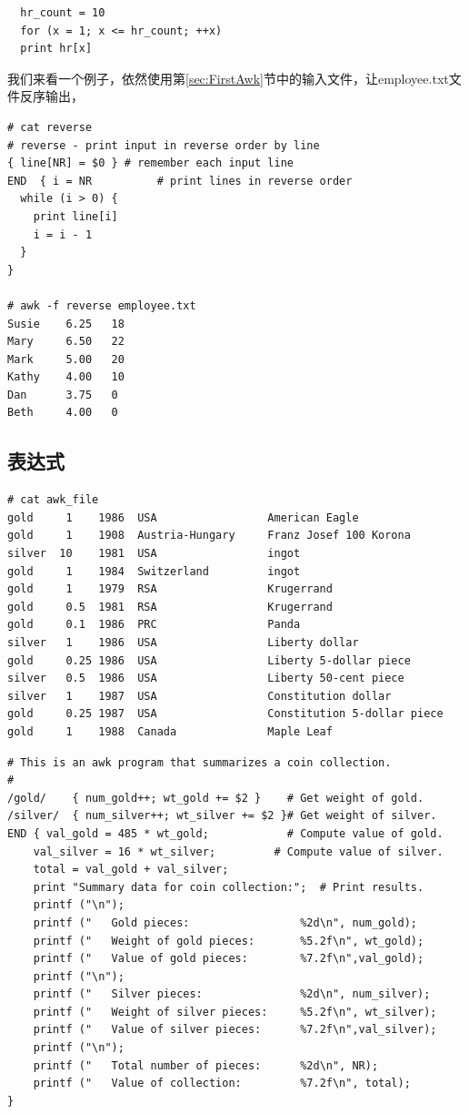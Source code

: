 \begin{verbatim}
  hr_count = 10
  for (x = 1; x <= hr_count; ++x)
  print hr[x]
\end{verbatim}

我们来看一个例子，依然使用第\ref{sec:FirstAwk}节中的输入文件，让employee.txt文件反序输出，

\begin{verbatim}
# cat reverse
# reverse - print input in reverse order by line
{ line[NR] = $0 } # remember each input line
END  { i = NR          # print lines in reverse order
  while (i > 0) {
    print line[i]
    i = i - 1
  }
}
  
# awk -f reverse employee.txt
Susie    6.25   18
Mary     6.50   22
Mark     5.00   20
Kathy    4.00   10
Dan      3.75   0
Beth     4.00   0
\end{verbatim}

\subsection{表达式}

\begin{verbatim}
# cat awk_file 
gold     1    1986  USA                 American Eagle
gold     1    1908  Austria-Hungary     Franz Josef 100 Korona
silver  10    1981  USA                 ingot
gold     1    1984  Switzerland         ingot
gold     1    1979  RSA                 Krugerrand
gold     0.5  1981  RSA                 Krugerrand
gold     0.1  1986  PRC                 Panda
silver   1    1986  USA                 Liberty dollar
gold     0.25 1986  USA                 Liberty 5-dollar piece
silver   0.5  1986  USA                 Liberty 50-cent piece
silver   1    1987  USA                 Constitution dollar
gold     0.25 1987  USA                 Constitution 5-dollar piece
gold     1    1988  Canada              Maple Leaf
\end{verbatim}

\begin{verbatim}
# This is an awk program that summarizes a coin collection.
#
/gold/    { num_gold++; wt_gold += $2 }    # Get weight of gold.
/silver/  { num_silver++; wt_silver += $2 }# Get weight of silver.
END { val_gold = 485 * wt_gold;            # Compute value of gold.
    val_silver = 16 * wt_silver;         # Compute value of silver.
    total = val_gold + val_silver;
    print "Summary data for coin collection:";  # Print results.
    printf ("\n");
    printf ("   Gold pieces:                 %2d\n", num_gold);
    printf ("   Weight of gold pieces:       %5.2f\n", wt_gold);
    printf ("   Value of gold pieces:        %7.2f\n",val_gold);
    printf ("\n");
    printf ("   Silver pieces:               %2d\n", num_silver);
    printf ("   Weight of silver pieces:     %5.2f\n", wt_silver);
    printf ("   Value of silver pieces:      %7.2f\n",val_silver);
    printf ("\n");
    printf ("   Total number of pieces:      %2d\n", NR);
    printf ("   Value of collection:         %7.2f\n", total);
}
\end{verbatim}

